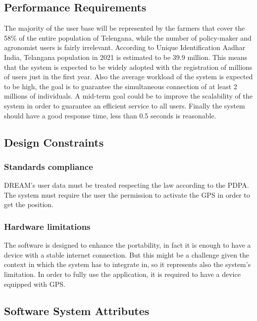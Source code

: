 \documentclass[table, 12pt]{article}
\begin{document}
\subsection{Performance Requirements}
The majority of the user base will be represented by the farmers that cover the 58\% \cite{specification} of the entire population of Telengana, while the number of policy-maker and agronomist users is fairly irrelevant.
According to Unique Identification Aadhar India, Telangana population in 2021 is estimated to be 39.9 million\cite{population}.
This means that the system is expected to be widely adopted with the registration of millions of users just in the first year.
Also the average workload of the system is expected to be high, the goal is to guarantee the simultaneous connection of at least 2 millions of individuals.
A mid-term goal could be to improve the scalability of the system in order to guarantee an efficient service to all users.
Finally the system should have a good response time, less than 0.5 seconds is reasonable.
\subsection{Design Constraints}

\subsubsection{Standards compliance}
DREAM's user data must be treated respecting the law according to the PDPA\cite{pdpa}.
The system must require the user the permission to activate the GPS in order to get the position.
\subsubsection{Hardware limitations}
The software is designed to enhance the portability, in fact it is enough to have a device with a stable internet connection. But this might be a challenge given the context in which the system has to integrate in, so it represents also the system's limitation.
In order to fully use the application, it is required to have a device equipped with GPS.

\subsection{Software System Attributes}
\end{document}
